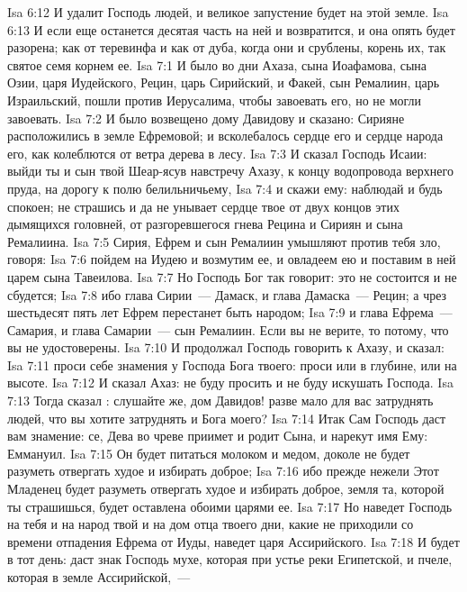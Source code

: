 \vs Isa 6:12 И удалит Господь людей, и великое запустение будет на этой земле.
\vs Isa 6:13 И если еще останется десятая часть на ней и возвратится, и она опять будет разорена;  как от теревинфа и как от дуба, когда они и срублены,  корень их, так святое семя  корнем ее.
\vs Isa 7:1 И было во дни Ахаза, сына Иоафамова, сына Озии, царя Иудейского, Рецин, царь Сирийский, и Факей, сын Ремалиин, царь Израильский, пошли против Иерусалима, чтобы завоевать его, но не могли завоевать.
\vs Isa 7:2 И было возвещено дому Давидову и сказано: Сирияне расположились в земле Ефремовой; и всколебалось сердце его и сердце народа его, как колеблются от ветра дерева в лесу.
\rsbpar\vs Isa 7:3 И сказал Господь Исаии: выйди ты и сын твой Шеар-ясув навстречу Ахазу, к концу водопровода верхнего пруда, на дорогу к полю белильничьему,
\vs Isa 7:4 и скажи ему: наблюдай и будь спокоен; не страшись и да не унывает сердце твое от двух концов этих дымящихся головней, от разгоревшегося гнева Рецина и Сириян и сына Ремалиина.
\vs Isa 7:5 Сирия, Ефрем и сын Ремалиин умышляют против тебя зло, говоря:
\vs Isa 7:6 пойдем на Иудею и возмутим ее, и овладеем ею и поставим в ней царем сына Тавеилова.
\vs Isa 7:7 Но Господь Бог так говорит: это не состоится и не сбудется;
\vs Isa 7:8 ибо глава Сирии~--- Дамаск, и глава Дамаска~--- Рецин; а чрез шестьдесят пять лет Ефрем перестанет быть народом;
\vs Isa 7:9 и глава Ефрема~--- Самария, и глава Самарии~--- сын Ремалиин. Если вы не верите, то потому, что вы не удостоверены.
\vs Isa 7:10 И продолжал Господь говорить к Ахазу, и сказал:
\vs Isa 7:11 проси себе знамения у Господа Бога твоего: проси или в глубине, или на высоте.
\vs Isa 7:12 И сказал Ахаз: не буду просить и не буду искушать Господа.
\vs Isa 7:13 Тогда сказал : слушайте же, дом Давидов! разве мало для вас затруднять людей, что вы хотите затруднять и Бога моего?
\vs Isa 7:14 Итак Сам Господь даст вам знамение: се, Дева во чреве приимет и родит Сына, и нарекут имя Ему: Еммануил.
\vs Isa 7:15 Он будет питаться молоком и медом, доколе не будет разуметь отвергать худое и избирать доброе;
\vs Isa 7:16 ибо прежде нежели Этот Младенец будет разуметь отвергать худое и избирать доброе, земля та, которой ты страшишься, будет оставлена обоими царями ее.
\vs Isa 7:17 Но наведет Господь на тебя и на народ твой и на дом отца твоего дни, какие не приходили со времени отпадения Ефрема от Иуды, наведет царя Ассирийского.
\vs Isa 7:18 И будет в тот день: даст знак Господь мухе, которая при устье реки Египетской, и пчеле, которая в земле Ассирийской,~---
